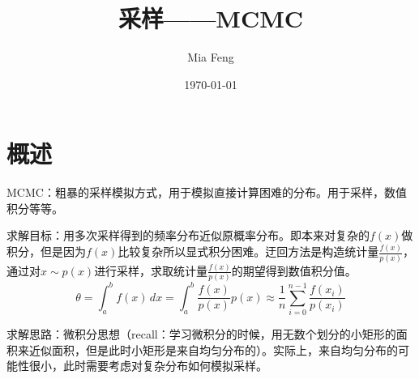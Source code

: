 \documentclass{ctexart}
\title{采样——MCMC} %
\author{Mia Feng} %
\date{\today} %
\begin{document}
\maketitle %




\section{概述}
MCMC：粗暴的采样模拟方式，用于模拟直接计算困难的分布。用于采样，数值积分等等。

求解目标：用多次采样得到的频率分布近似原概率分布。即本来对复杂的$f\left(x\right)$做积分，但是因为$f\left(x\right)$比较复杂所以显式积分困难。迂回方法是构造统计量$\frac{f\left(x\right)}{p\left(x\right)}$，通过对$x\sim p\left(x\right)$进行采样，求取统计量$\frac{f\left(x\right)}{p\left(x\right)}$的期望得到数值积分值。
\begin{equation}
\theta = \int_{a}^{b}f\left(x\right)\,dx=\int_{a}^{b}\frac{f\left(x\right)}{p\left(x\right)}p\left(x\right)\approx \frac{1}{n}\sum\limits_{i=0}^{n-1}\frac{f\left(x_i\right)}{p\left(x_i\right)}
\end{equation}

求解思路：微积分思想（recall：学习微积分的时候，用无数个划分的小矩形的面积来近似面积，但是此时小矩形是来自均匀分布的）。实际上，来自均匀分布的可能性很小，此时需要考虑对复杂分布如何模拟采样。
\end{document}

